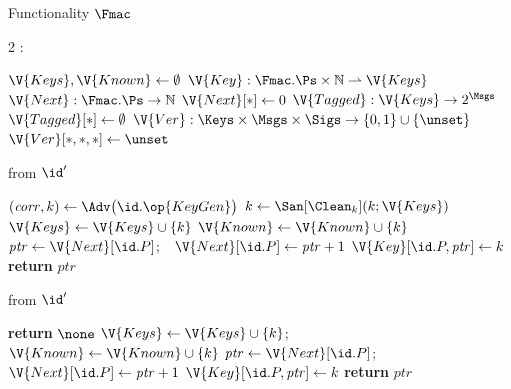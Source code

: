 \begin{interface}[nofloat]{Functionality $\Fmac$ \\
\params{$\PID$, \quad $\Ps$, \quad $\admits$, \quad
$\uses := \{(\Adv,\serves)\}$, \quad $\pars := \none$}}

{\scriptsize
\setlength{\columnsep}{1.4em}
\begin{multicols}{2}
:
\begin{algorithmic}[1]
\setcounter{contline}{0}\algcont
\State $\V{Keys}, \V{Known} \gets \emptyset$
\State $\V{Key} : \Fmac.\Ps \times \mathbb{N} \rightharpoonup \V{Keys}$
\State $\V{Next} : \Fmac.\Ps \to \mathbb{N}$
\State $\V{Next}[*] \gets 0$
\State $\V{Tagged} : \V{Keys} \to 2^{\Msgs}$
\State $\V{Tagged}[*] \gets \emptyset$
\State $\V{Ver} : \Keys \times \Msgs \times \Sigs \to \{0,1\} \cup \{\unset\}$
\State $\V{Ver}[*,*,*] \gets \unset$
\algsave
\end{algorithmic}
\vspace{1.4ex}

 \quad from $\id'$
\begin{algorithmic}[1]
\algcont
\State $(\mathit{corr}, k) \gets \Adv\bigl(\id.\op{KeyGen}\bigr)$
\State $k \gets \San[\Clean_{k}](k; \V{Keys})$
\State $\V{Keys} \gets \V{Keys} \cup \{k\}$
  \State $\V{Known} \gets \V{Known} \cup \{k\}$
\EndIf
\State $\mathit{ptr} \gets \V{Next}[\id.P]$;\ \ $\V{Next}[\id.P] \gets \mathit{ptr} + 1$
\State $\V{Key}[\id.P, \mathit{ptr}] \gets k$
\State \textbf{return} $\mathit{ptr}$
\algsave
\end{algorithmic}
\vspace{1.4ex}

 \quad from $\id'$
\begin{algorithmic}[1]
\algcont
{}
  \State \textbf{return} $\none$
\EndIf
\State $\V{Keys} \gets \V{Keys} \cup \{k\}$;\ \ $\V{Known} \gets \V{Known} \cup \{k\}$
\State $\mathit{ptr} \gets \V{Next}[\id.P]$;\ \ $\V{Next}[\id.P] \gets \mathit{ptr} + 1$
\State $\V{Key}[\id.P, \mathit{ptr}] \gets k$
\State \textbf{return} $\mathit{ptr}$
\algsave
\end{algorithmic}
\vspace{1.4ex}


\end{multicols}}
\end{interface}
